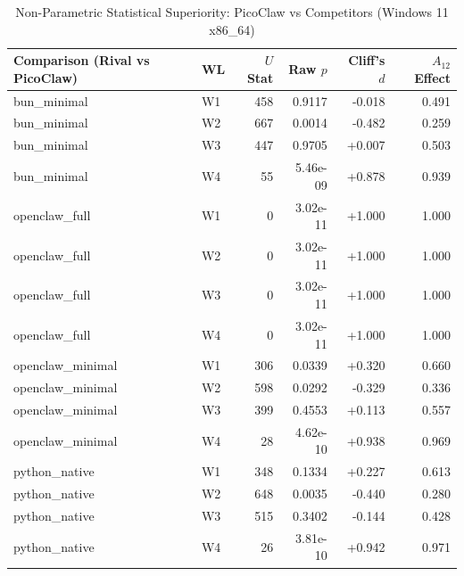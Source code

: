\begin{table}[t]
\centering\small
\caption{Non-Parametric Statistical Superiority: PicoClaw vs Competitors (Windows 11 x86_64)}
\label{tab:Windows_stat_tests}
\begin{tabular}{llrrrr}
\toprule
Comparison (Rival vs PicoClaw) & WL & $U$ Stat & Raw $p$ & Cliff's $d$ & $A_{12}$ Effect \\
\midrule
bun\_minimal & W1 & 458 & 0.9117 & -0.018 & 0.491 \\
bun\_minimal & W2 & 667 & 0.0014 & -0.482 & 0.259 \\
bun\_minimal & W3 & 447 & 0.9705 & +0.007 & 0.503 \\
bun\_minimal & W4 & 55 & 5.46e-09 & +0.878 & 0.939 \\
openclaw\_full & W1 & 0 & 3.02e-11 & +1.000 & 1.000 \\
openclaw\_full & W2 & 0 & 3.02e-11 & +1.000 & 1.000 \\
openclaw\_full & W3 & 0 & 3.02e-11 & +1.000 & 1.000 \\
openclaw\_full & W4 & 0 & 3.02e-11 & +1.000 & 1.000 \\
openclaw\_minimal & W1 & 306 & 0.0339 & +0.320 & 0.660 \\
openclaw\_minimal & W2 & 598 & 0.0292 & -0.329 & 0.336 \\
openclaw\_minimal & W3 & 399 & 0.4553 & +0.113 & 0.557 \\
openclaw\_minimal & W4 & 28 & 4.62e-10 & +0.938 & 0.969 \\
python\_native & W1 & 348 & 0.1334 & +0.227 & 0.613 \\
python\_native & W2 & 648 & 0.0035 & -0.440 & 0.280 \\
python\_native & W3 & 515 & 0.3402 & -0.144 & 0.428 \\
python\_native & W4 & 26 & 3.81e-10 & +0.942 & 0.971 \\
\bottomrule
\end{tabular}
\end{table}
